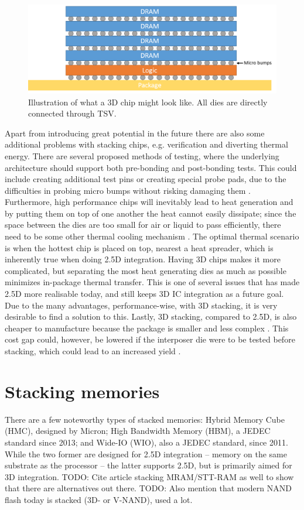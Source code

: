 \begin{figure}[!h]
\centering
\includegraphics[width=0.75\linewidth]{figure/3D-integration.png}
\caption{Illustration of what a 3D chip might look like. All dies are directly connected through TSV.}
\label{3D-chip}
\end{figure}

Apart from introducing great potential in the future there are also some additional problems with stacking chips, e.g. verification and diverting thermal energy. There are several proposed methods of testing, where the underlying architecture should support both pre-bonding and post-bonding tests. This could include creating additional test pins or creating special probe pads, due to the difficulties in probing micro bumps without risking damaging them \cite{5751450}. Furthermore, high performance chips will inevitably lead to heat generation and by putting them  on top of one another the heat cannot easily dissipate; since the space between the dies are too small for air or liquid to pass efficiently, there need to be some other thermal cooling mechanism \cite{5501261}. The optimal thermal scenario is when the hottest chip is placed on top, nearest a heat spreader, which is inherently true when doing 2.5D integration. Having 3D chips makes it more complicated, but separating the most heat generating dies as much as possible minimizes in-package thermal transfer. This is one of several issues that has made 2.5D more realisable today, and still keeps 3D IC integration as a future goal. Due to the many advantages, performance-wise, with 3D stacking, it is very desirable to find a solution to this. Lastly, 3D stacking, compared to 2.5D, is also cheaper to manufacture because the package is smaller and less complex \cite{6263032}. This cost gap could, however, be lowered if the interposer die were to be tested before stacking, which could lead to an increased yield \cite{6542130}.
\bigskip

\section{Stacking memories}
There are a few noteworthy types of stacked memories: Hybrid Memory Cube (HMC), designed by Micron; High Bandwidth Memory (HBM), a JEDEC standard since 2013; and Wide-IO (WIO), also a JEDEC standard, since 2011. While the two former are designed for 2.5D integration -- memory on the same substrate as the processor -- the latter supports 2.5D, but is primarily aimed for 3D integration. TODO: Cite article stacking MRAM/STT-RAM as well to show that there are alternatives out there. TODO: Also mention that modern NAND flash today is stacked (3D- or V-NAND), used a lot. 
\bigskip

